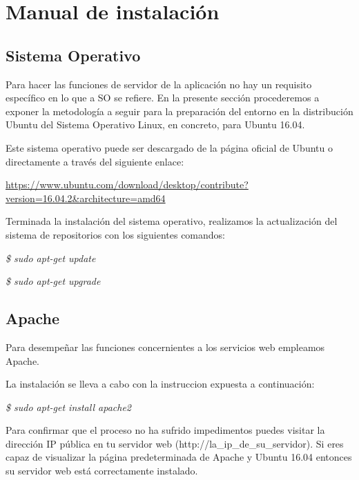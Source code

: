 \documentclass[11pt,spanish,
		listoftables,listoffigures]
		{tfgplantilla}
\begin{document}
\newpage
\section{Manual de instalación}

\subsection {Sistema Operativo}

Para hacer las funciones de servidor de la aplicación no hay un requisito específico en lo que a SO se refiere. En la presente sección procederemos a exponer la metodología a seguir para la preparación del entorno en la distribución Ubuntu del Sistema Operativo Linux, en concreto, para Ubuntu 16.04.

Este sistema operativo puede ser descargado de la página oficial de Ubuntu o directamente a través del siguiente enlace:

\noindent \url {https://www.ubuntu.com/download/desktop/contribute?version=16.04.2&architecture=amd64}

Terminada la instalación del sistema operativo, realizamos la actualización del sistema de repositorios con los siguientes comandos:

\textit {\$ sudo apt-get update}

\textit {\$ sudo apt-get upgrade}

\subsection {Apache}

Para desempeñar las funciones concernientes a los servicios web empleamos Apache. 

La instalación se lleva a cabo con la instruccion expuesta a continuación:

\textit {\$ sudo apt-get install apache2}

Para confirmar que el proceso no ha sufrido impedimentos puedes visitar la dirección IP pública en tu servidor web (http://la\_ip\_de\_su\_servidor). Si eres capaz de visualizar la página predeterminada de Apache y Ubuntu 16.04 entonces su servidor web está correctamente instalado.
\end{document}
